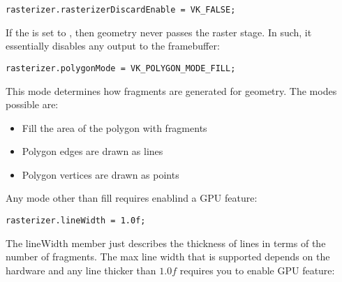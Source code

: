 \begin{center}
\begin{minipage}{0.95\linewidth}
\begin{lstlisting}
rasterizer.rasterizerDiscardEnable = VK_FALSE;
\end{lstlisting}
\end{minipage}
\end{center}

\par If the  is set to , then geometry never passes the raster stage. In such, it essentially disables any output to the framebuffer:

\begin{center}
\begin{minipage}{0.95\linewidth}
\begin{lstlisting}
rasterizer.polygonMode = VK_POLYGON_MODE_FILL;
\end{lstlisting}
\end{minipage}
\end{center}

\par This mode determines how fragments are generated for geometry. The modes possible are:
\begin{itemize}
\item {} Fill the area of the polygon with fragments
\item {} Polygon edges are drawn as lines
\item {} Polygon vertices are drawn as points
\end{itemize}

\par Any mode other than fill requires enablind a GPU feature:

\begin{center}
\begin{minipage}{0.95\linewidth}
\begin{lstlisting}
rasterizer.lineWidth = 1.0f;
\end{lstlisting}
\end{minipage}
\end{center}

\par The lineWidth member just describes the thickness of lines in terms of the number of fragments. The max line width that is supported depends on the hardware and any line thicker than $1.0f$ requires you to enable  GPU feature:

